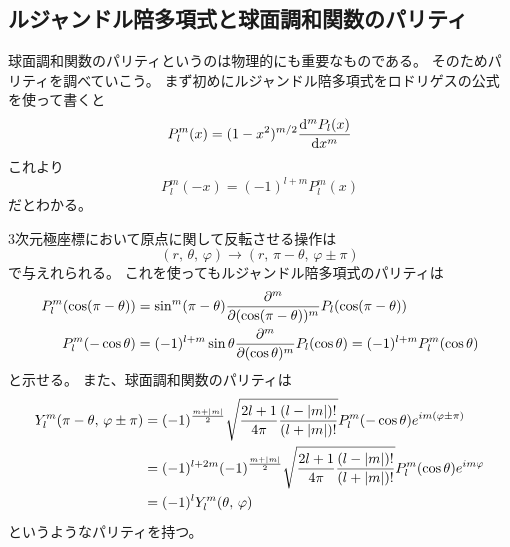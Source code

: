 \documentclass[../../master.tex]{subfiles}
\begin{document}
\subsection{ルジャンドル陪多項式と球面調和関数のパリティ}
球面調和関数のパリティというのは物理的にも重要なものである。
そのためパリティを調べていこう。
まず初めにルジャンドル陪多項式をロドリゲスの公式を使って書くと
\begin{equation}
	P_l^{m}(x) = (1-x^2)^{m/2}\dv[m]{P_l(x)}{x}
\end{equation}
これより
\begin{equation}
	P_l^m(-x) = (-1)^{l+m}P_l^m(x)
\end{equation}
だとわかる。

3次元極座標において原点に関して反転させる操作は
\begin{equation}
	(r,\,\theta,\,\varphi)\rightarrow (r,\,\pi-\theta,\,\varphi\pm\pi)
\end{equation}
で与えれられる。
これを使ってもルジャンドル陪多項式のパリティは
\begin{equation}\begin{aligned}[b]
    P_l^m(\cos(\pi-\theta)) &= \sin^m(\pi-\theta)\pdv[m]{(\cos(\pi-\theta))}P_l(\cos(\pi-\theta))\\
	P_l^m(-\cos\theta) &= (-1)^{l+m} \sin\theta\pdv[m]{(\cos\theta)}P_l(\cos\theta) =(-1)^{l+m} P_l^m(\cos\theta)
\end{aligned}\end{equation}
と示せる。
また、球面調和関数のパリティは
\begin{equation}\begin{aligned}[b]
	Y_l^m(\pi-\theta,\,\varphi\pm\pi)
	&=(-1)^{\frac{m+\abs{m}}{2}}\sqrt{\frac{2l+1}{4\pi}\frac{(l-\abs{m})!}{(l+\abs{m})!}}P_l^m(-\cos\theta)e^{im(\varphi\pm\pi)}\\
	&=(-1)^{l+2m}(-1)^{\frac{m+\abs{m}}{2}}\sqrt{\frac{2l+1}{4\pi}\frac{(l-\abs{m})!}{(l+\abs{m})!}}P_l^m(\cos\theta)e^{im\varphi}\\
	&=(-1)^lY_l^m(\theta,\,\varphi)
\end{aligned}\end{equation}
というようなパリティを持つ。
\end{document}

